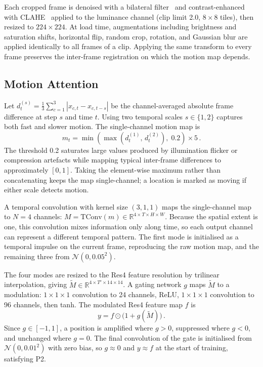 \documentclass[conference]{IEEEtran}
\begin{document}
Each cropped frame is denoised with a bilateral filter~\cite{bilateral} and
contrast-enhanced with CLAHE~\cite{clahe} applied to the luminance channel (clip
limit 2.0, $8 \times 8$ tiles), then resized to $224 \times 224$. At
load time, augmentations including brightness and saturation shifts,
horizontal flip, random crop, rotation, and Gaussian blur are applied
identically to all frames of a clip. Applying the same transform to
every frame preserves the inter-frame registration on which the motion
map depends.

\subsection{Motion Attention}
\label{sec:ma}

Let $d^{(s)}_t = \frac{1}{3} \sum_{c=1}^{3} |x_{c,t} - x_{c,t-s}|$
be the channel-averaged absolute frame difference at step $s$ and time
$t$. Using two temporal scales $s \in \{1, 2\}$ captures both fast and
slower motion. The single-channel motion map is
\begin{equation}
  m_t = \min\!\left( \max\!\left(d^{(1)}_t,\, d^{(2)}_t\right),\; 0.2 \right) \times 5 \,.
  \label{eq:motion}
\end{equation}
The threshold 0.2 saturates large values produced by illumination
flicker or compression artefacts while mapping typical inter-frame
differences to approximately $[0, 1]$. Taking the element-wise maximum
rather than concatenating keeps the map single-channel; a location is
marked as moving if either scale detects motion.

A temporal convolution with kernel size $(3, 1, 1)$ maps the
single-channel map to $N=4$ channels:
$M = \mathrm{TConv}(m) \in \mathbb{R}^{4 \times T \times H \times W}$.
Because the spatial extent is one, this convolution mixes information
only along time, so each output channel can represent a different
temporal pattern. The first mode is initialised as a temporal impulse
on the current frame, reproducing the raw motion map, and the remaining
three from $\mathcal{N}(0, 0.05^2)$.

The four modes are resized to the Res4 feature resolution by trilinear
interpolation, giving $\tilde{M} \in \mathbb{R}^{4 \times T' \times 14
\times 14}$. A gating network $g$ maps $\tilde{M}$ to a modulation:
$1 \times 1 \times 1$ convolution to 24 channels, ReLU, $1 \times 1
\times 1$ convolution to 96 channels, then tanh. The modulated Res4
feature map $f$ is
\begin{equation}
  y = f \odot \bigl(1 + g(\tilde{M})\bigr) \,.
  \label{eq:gate}
\end{equation}
Since $g \in [-1, 1]$, a position is amplified where $g > 0$,
suppressed where $g < 0$, and unchanged where $g = 0$. The final
convolution of the gate is initialised from $\mathcal{N}(0, 0.01^2)$
with zero bias, so $g \approx 0$ and $y \approx f$ at the start of
training, satisfying P2.
\end{document}
